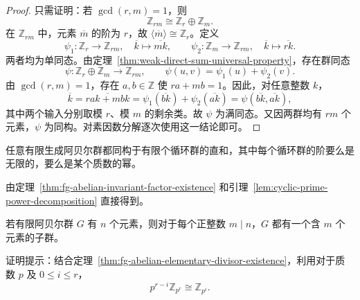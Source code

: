\begin{proof}
只需证明：若 $\gcd(r,m)=1$，则
\[
  \mathbb Z_{rm}\cong\mathbb Z_r\oplus\mathbb Z_m.
\]
在 $\mathbb Z_{rm}$ 中，元素 $\overline m$ 的阶为 $r$，故
$\langle\overline m\rangle\cong\mathbb Z_r$。定义
\[
  \psi_1:\mathbb Z_r\longrightarrow\mathbb Z_{rm},
  \quad \overline k\longmapsto\overline{mk},
  \qquad
  \psi_2:\mathbb Z_m\longrightarrow\mathbb Z_{rm},
  \quad \overline k\longmapsto\overline{rk}.
\]
两者均为单同态。由定理~\ref{thm:weak-direct-sum-universal-property}，存在群同态
\[
  \psi:\mathbb Z_r\oplus\mathbb Z_m\longrightarrow\mathbb Z_{rm},
  \qquad
  \psi(u,v)=\psi_1(u)+\psi_2(v).
\]
由 $\gcd(r,m)=1$，存在 $a,b\in\mathbb Z$ 使 $ra+mb=1$。因此，对任意整数 $k$，
\[
  \overline k=\overline{rak+mbk}
  =\psi_1(\overline{bk})+\psi_2(\overline{ak})
  =\psi(\overline{bk},\overline{ak}),
\]
其中两个输入分别取模 $r$、模 $m$ 的剩余类。故 $\psi$ 为满同态。又因两群均有 $rm$ 个元素，$\psi$ 为同构。对素因数分解逐次使用这一结论即可。
\end{proof}

\begin{theorem}\label{thm:fg-abelian-elementary-divisor-existence}
任意有限生成阿贝尔群都同构于有限个循环群的直和，其中每个循环群的阶要么是无限的，要么是某个质数的幂。
\end{theorem}

\begin{purpleproof}
由定理~\ref{thm:fg-abelian-invariant-factor-existence}
和引理~\ref{lem:cyclic-prime-power-decomposition} 直接得到。
\end{purpleproof}

\begin{corollary}\label{cor:finite-abelian-subgroups-all-divisors}
若有限阿贝尔群 $G$ 有 $n$ 个元素，则对于每个正整数 $m\mid n$，$G$ 都有一个含 $m$ 个元素的子群。
\end{corollary}

\begin{purplenote}
证明提示：结合定理~\ref{thm:fg-abelian-elementary-divisor-existence}，利用对于质数 $p$ 及 $0\leq i\leq r$，
\[
  p^{r-i}\mathbb Z_{p^r}\cong\mathbb Z_{p^i}.
\]
\end{purplenote}


